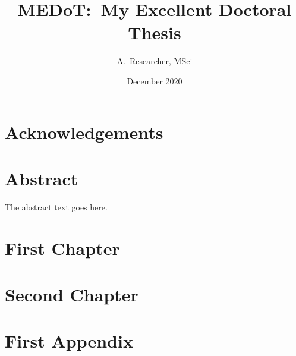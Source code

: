 \documentclass{uon-thesis}
\title{MEDoT:~My Excellent Doctoral Thesis}
\author{A.~Researcher, MSci}
\date{December 2020}
\begin{document}
\maketitle

\chapter*{Acknowledgements}


\tableofcontents
\listoffigures
\listoftables

\chapter*{Abstract}
The abstract text goes here.

\chapter{First Chapter}


\chapter{Second Chapter}



\printbibliography[title={References}]

\appendix

\chapter{First Appendix}

\end{document}
